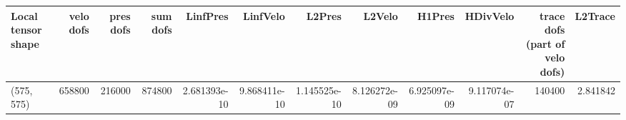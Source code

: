 \begin{tabular}{lrrrrrrrrrrr}
\toprule
Local tensor shape &  velo dofs &  pres dofs &  sum dofs &     LinfPres &     LinfVelo &       L2Pres &       L2Velo &       H1Pres &     HDivVelo &  trace dofs (part of velo dofs) &  L2Trace \\
\midrule
        (575, 575) &     658800 &     216000 &    874800 & 2.681393e-10 & 9.868411e-10 & 1.145525e-10 & 8.126272e-09 & 6.925097e-09 & 9.117074e-07 &                          140400 & 2.841842 \\
\bottomrule
\end{tabular}
